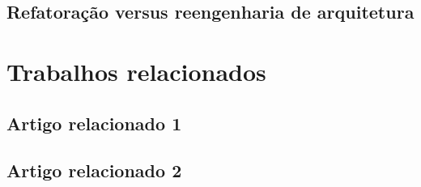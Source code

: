 
\subsection{Refatoração versus reengenharia de arquitetura}

\section{Trabalhos relacionados}

\subsection{Artigo relacionado 1}

\subsection{Artigo relacionado 2}